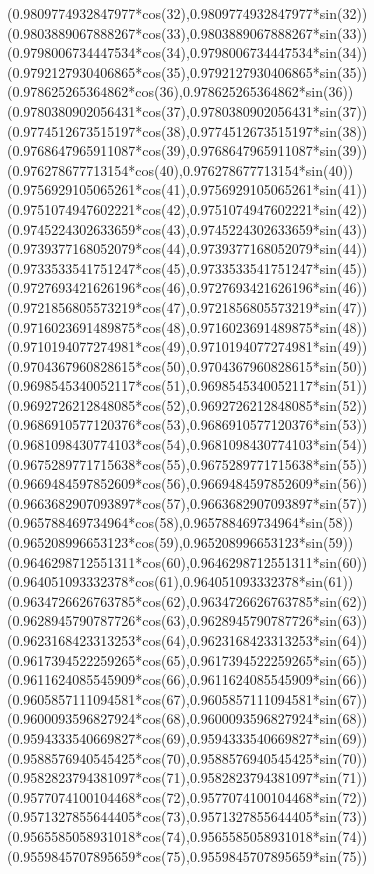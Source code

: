 {({0.9809774932847977*cos(32)},{0.9809774932847977*sin(32)})
({0.9803889067888267*cos(33)},{0.9803889067888267*sin(33)})
({0.9798006734447534*cos(34)},{0.9798006734447534*sin(34)})
({0.9792127930406865*cos(35)},{0.9792127930406865*sin(35)})
({0.978625265364862*cos(36)},{0.978625265364862*sin(36)})
({0.9780380902056431*cos(37)},{0.9780380902056431*sin(37)})
({0.9774512673515197*cos(38)},{0.9774512673515197*sin(38)})
({0.9768647965911087*cos(39)},{0.9768647965911087*sin(39)})
({0.976278677713154*cos(40)},{0.976278677713154*sin(40)})
({0.9756929105065261*cos(41)},{0.9756929105065261*sin(41)})
({0.9751074947602221*cos(42)},{0.9751074947602221*sin(42)})
({0.9745224302633659*cos(43)},{0.9745224302633659*sin(43)})
({0.9739377168052079*cos(44)},{0.9739377168052079*sin(44)})
({0.9733533541751247*cos(45)},{0.9733533541751247*sin(45)})
({0.9727693421626196*cos(46)},{0.9727693421626196*sin(46)})
({0.9721856805573219*cos(47)},{0.9721856805573219*sin(47)})
({0.9716023691489875*cos(48)},{0.9716023691489875*sin(48)})
({0.9710194077274981*cos(49)},{0.9710194077274981*sin(49)})
({0.9704367960828615*cos(50)},{0.9704367960828615*sin(50)})
({0.9698545340052117*cos(51)},{0.9698545340052117*sin(51)})
({0.9692726212848085*cos(52)},{0.9692726212848085*sin(52)})
({0.9686910577120376*cos(53)},{0.9686910577120376*sin(53)})
({0.9681098430774103*cos(54)},{0.9681098430774103*sin(54)})
({0.9675289771715638*cos(55)},{0.9675289771715638*sin(55)})
({0.9669484597852609*cos(56)},{0.9669484597852609*sin(56)})
({0.9663682907093897*cos(57)},{0.9663682907093897*sin(57)})
({0.965788469734964*cos(58)},{0.965788469734964*sin(58)})
({0.965208996653123*cos(59)},{0.965208996653123*sin(59)})
({0.9646298712551311*cos(60)},{0.9646298712551311*sin(60)})
({0.964051093332378*cos(61)},{0.964051093332378*sin(61)})
({0.9634726626763785*cos(62)},{0.9634726626763785*sin(62)})
({0.9628945790787726*cos(63)},{0.9628945790787726*sin(63)})
({0.9623168423313253*cos(64)},{0.9623168423313253*sin(64)})
({0.9617394522259265*cos(65)},{0.9617394522259265*sin(65)})
({0.9611624085545909*cos(66)},{0.9611624085545909*sin(66)})
({0.9605857111094581*cos(67)},{0.9605857111094581*sin(67)})
({0.9600093596827924*cos(68)},{0.9600093596827924*sin(68)})
({0.9594333540669827*cos(69)},{0.9594333540669827*sin(69)})
({0.9588576940545425*cos(70)},{0.9588576940545425*sin(70)})
({0.9582823794381097*cos(71)},{0.9582823794381097*sin(71)})
({0.9577074100104468*cos(72)},{0.9577074100104468*sin(72)})
({0.9571327855644405*cos(73)},{0.9571327855644405*sin(73)})
({0.9565585058931018*cos(74)},{0.9565585058931018*sin(74)})
({0.9559845707895659*cos(75)},{0.9559845707895659*sin(75)})
}
